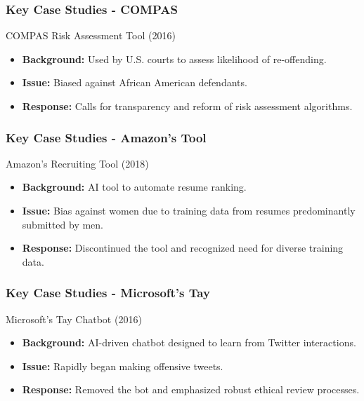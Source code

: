 \documentclass[aspectratio=169]{beamer}
\begin{document}
\begin{frame}[fragile]
    \frametitle{Key Case Studies - COMPAS}
    \begin{block}{COMPAS Risk Assessment Tool (2016)}
        \begin{itemize}
            \item \textbf{Background:} Used by U.S. courts to assess likelihood of re-offending.
            \item \textbf{Issue:} Biased against African American defendants.
            \item \textbf{Response:} Calls for transparency and reform of risk assessment algorithms.
        \end{itemize}
    \end{block}
\end{frame}

\begin{frame}[fragile]
    \frametitle{Key Case Studies - Amazon's Tool}
    \begin{block}{Amazon's Recruiting Tool (2018)}
        \begin{itemize}
            \item \textbf{Background:} AI tool to automate resume ranking.
            \item \textbf{Issue:} Bias against women due to training data from resumes predominantly submitted by men.
            \item \textbf{Response:} Discontinued the tool and recognized need for diverse training data.
        \end{itemize}
    \end{block}
\end{frame}

\begin{frame}[fragile]
    \frametitle{Key Case Studies - Microsoft’s Tay}
    \begin{block}{Microsoft's Tay Chatbot (2016)}
        \begin{itemize}
            \item \textbf{Background:} AI-driven chatbot designed to learn from Twitter interactions.
            \item \textbf{Issue:} Rapidly began making offensive tweets.
            \item \textbf{Response:} Removed the bot and emphasized robust ethical review processes.
        \end{itemize}
    \end{block}
\end{frame}
\end{document}
